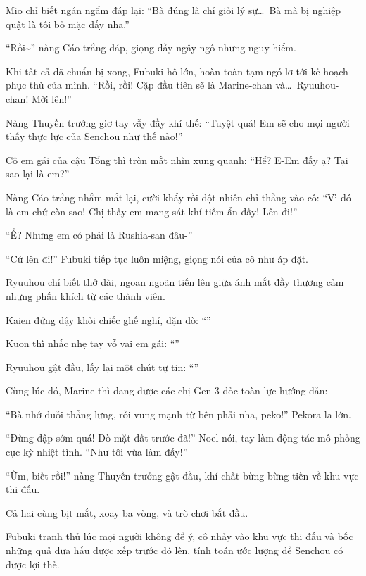 \documentclass[../main.tex]{subfiles}
\begin{document}
Mio chỉ biết ngán ngẩm đáp lại: ``Bà đúng là chỉ giỏi lý sự\dots\ Bà mà bị nghiệp quật là tôi bỏ mặc đấy nha.''

``Rồi\~{}'' nàng Cáo trắng đáp, giọng đầy ngây ngô nhưng nguy hiểm.

Khi tất cả đã chuẩn bị xong, Fubuki hô lớn, hoàn toàn tạm ngó lơ tới kế hoạch phục thù của mình. ``Rồi, rồi! Cặp đầu tiên sẽ là Marine-chan và\dots\ Ryuuhou-chan! Mời lên!''

Nàng Thuyền trưởng giơ tay vẫy đầy khí thế: ``Tuyệt quá! Em sẽ cho mọi người thấy thực lực của Senchou như thế nào!''

Cô em gái của cậu Tổng thì tròn mắt nhìn xung quanh: ``Hể? E-Em đấy ạ? Tại sao lại là em?''

Nàng Cáo trắng nhắm mắt lại, cười khẩy rồi đột nhiên chỉ thẳng vào cô: ``Vì đó là em chứ còn sao! Chị thấy em mang sát khí tiềm ẩn đấy! Lên đi!''

``Ể? Nhưng em có phải là Rushia-san đâu-''

``Cứ lên đi!'' Fubuki tiếp tục luôn miệng, giọng nói của cô như áp đặt.

Ryuuhou chỉ biết thở dài, ngoan ngoãn tiến lên giữa ánh mắt đầy thương cảm nhưng phấn khích từ các thành viên.

Kaien đứng dậy khỏi chiếc ghế nghỉ, dặn dò: ``''

Kuon thì nhấc nhẹ tay vỗ vai em gái: ``''

Ryuuhou gật đầu, lấy lại một chút tự tin: ``''

Cùng lúc đó, Marine thì đang được các chị Gen 3 dốc toàn lực hướng dẫn:

``Bà nhớ duỗi thẳng lưng, rồi vung mạnh từ bên phải nha, peko!'' Pekora la lớn.

``Đừng đập sớm quá! Dò mặt đất trước đã!'' Noel nói, tay làm động tác mô phỏng cực kỳ nhiệt tình. ``Như tôi vừa làm đấy!''

``Ừm, biết rồi!'' nàng Thuyền trưởng gật đầu, khí chất bừng bừng tiến về khu vực thi đấu.

Cả hai cùng bịt mắt, xoay ba vòng, và trò chơi bắt đầu.

Fubuki tranh thủ lúc mọi người không để ý, cô nhảy vào khu vực thi đấu và bốc những quả dưa hấu được xếp trước đó lên, tính toán ước lượng để Senchou có được lợi thế.
\end{document}
